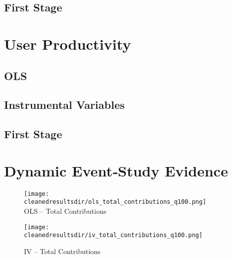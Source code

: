\documentclass{article}
\newcommand{\cleanedresultsdir}{../results/cleaned}
\begin{document}
\subsection{First Stage}



\clearpage
\section{User Productivity}
\label{sec:user_productivity}

\subsection{OLS}


\subsection{Instrumental Variables}


\subsection{First Stage}



\clearpage
\section{Dynamic Event‐Study Evidence}


\begin{figure}[H]
  \centering
  \texttt{[image: \\cleanedresultsdir/ols\_total\_contributions\_q100.png]}\\[2pt]
  \caption*{OLS – Total Contributions}
  \texttt{[image: \\cleanedresultsdir/iv\_total\_contributions\_q100.png]}\\[2pt]
  \caption*{IV – Total Contributions}
\end{figure}
\end{document}
